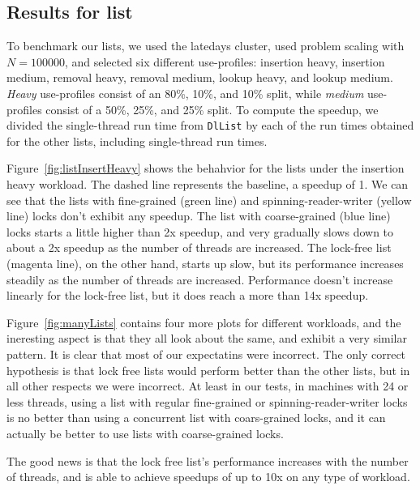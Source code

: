 \documentclass[11pt]{article}
\begin{document}
\subsection{Results for list}
To benchmark our lists, we used the latedays cluster, used problem scaling with
$N=100000$, and selected six different use-profiles: insertion heavy, insertion
medium, removal heavy, removal medium, lookup heavy, and lookup medium. {\it
Heavy} use-profiles consist of an 80\%, 10\%, and 10\% split, while {\it
medium} use-profiles consist of a 50\%, 25\%, and 25\% split. To compute the
speedup, we divided the single-thread run time from {\tt DlList} by each of the
run times obtained for the other lists, including single-thread run times.

Figure~\ref{fig:listInsertHeavy} shows the behahvior for the lists under the
insertion heavy workload. The dashed line represents the baseline, a speedup of
1. We can see that the lists with fine-grained (green line) and
spinning-reader-writer (yellow line) locks don't exhibit any speedup. The list
with coarse-grained (blue line) locks starts a little higher than 2x speedup,
and very gradually slows down to about a 2x speedup as the number of threads are
increased. The lock-free list (magenta line), on the other hand, starts up slow,
but its performance increases steadily as the number of threads are increased.
Performance doesn't increase linearly for the lock-free list, but it does reach
a more than 14x speedup.

Figure~\ref{fig:manyLists} contains four more plots for different workloads, and
the ineresting aspect is that they all look about the same, and exhibit a very
similar pattern. It is clear that most of our expectatins were incorrect. The
only correct hypothesis is that lock free lists would perform better than the
other lists, but in all other respects we were incorrect. At least in our tests,
in machines with 24 or less threads, using a list with regular fine-grained or
spinning-reader-writer locks is no better than using a concurrent list with
coars-grained locks, and it can actually be better to use lists with
coarse-grained locks.

The good news is that the lock free list's performance increases with the number
of threads, and is able to achieve speedups of up to 10x on any type of workload.
\end{document}
